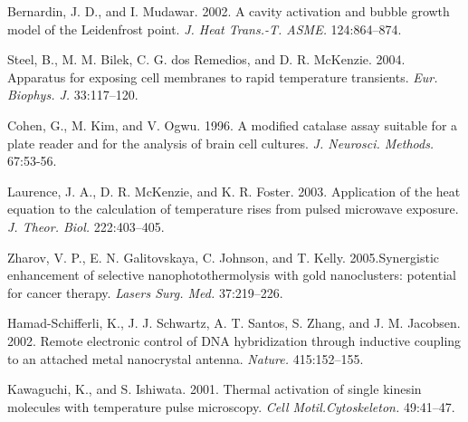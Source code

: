 \documentclass{biophys_letter}
\begin{document}
\begin{thebibliography}{99}
Bernardin, J. D., and I. Mudawar. 2002. A cavity activation and bubble growth model of the Leidenfrost point. {\it J. Heat Trans.-T. ASME.} 124:864--874.

Steel, B., M. M. Bilek, C. G. dos Remedios, and D. R. McKenzie. 2004. Apparatus for exposing cell membranes to rapid temperature transients. {\it Eur. Biophys. J.} 33:117--120.

Cohen, G., M. Kim, and V. Ogwu. 1996. A modified catalase assay suitable for a plate reader and for the analysis of brain cell cultures. {\it J. Neurosci. Methods.} 67:53-56.

Laurence, J. A., D. R. McKenzie, and K. R. Foster. 2003. Application of the heat equation to the calculation of temperature rises from pulsed microwave exposure. {\it J. Theor. Biol.} 222:403--405.

Zharov, V. P., E. N. Galitovskaya, C. Johnson, and T. Kelly. 2005.\break Synergistic enhancement of selective nanophotothermolysis with gold nanoclusters: potential for cancer therapy. {\it Lasers Surg. Med.} 37:219--226.

Hamad-Schifferli, K., J. J. Schwartz, A. T. Santos, S. Zhang, and J. M. Jacobsen. 2002. Remote electronic control of DNA hybridization through inductive coupling to an attached metal nanocrystal antenna. {\it Nature.} 415:152--155.

Kawaguchi, K., and S. Ishiwata. 2001. Thermal activation of single kinesin molecules with temperature pulse microscopy. {\it Cell Motil.\break Cytoskeleton.} 49:41--47.

\end{thebibliography}
\end{document}
